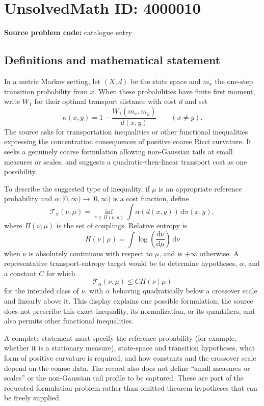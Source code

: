 \documentclass[11pt]{article}
\begin{document}
\section*{UnsolvedMath ID: 4000010}
\textbf{Source problem code:} catalogue entry
\subsection{Definitions and mathematical statement}
In a metric Markov setting, let $(X,d)$ be the state space and $m_x$ the one-step transition probability from $x$. When these probabilities have finite first moment, write $W_1$ for their optimal transport distance with cost $d$ and set
\[
 \kappa(x,y)=1-\frac{W_1(m_x,m_y)}{d(x,y)}\qquad(x\ne y).
\]
The source asks for transportation inequalities or other functional inequalities expressing the concentration consequences of positive coarse Ricci curvature. It seeks a genuinely coarse formulation allowing non-Gaussian tails at small measures or scales, and suggests a quadratic-then-linear transport cost as one possibility.

To describe the suggested type of inequality, if $\mu$ is an appropriate reference probability and $\alpha:[0,\infty)\to[0,\infty)$ is a cost function, define
\[
 \mathcal T_\alpha(\nu,\mu)
 =\inf_{\pi\in\Pi(\nu,\mu)}\int\alpha(d(x,y))\,\mathrm d\pi(x,y),
\]
where $\Pi(\nu,\mu)$ is the set of couplings. Relative entropy is
\[
 H(\nu\mid\mu)=\int\log\!\left(\frac{\mathrm d\nu}{\mathrm d\mu}\right)\,\mathrm d\nu
\]
when $\nu$ is absolutely continuous with respect to $\mu$, and is $+\infty$ otherwise. A representative transport-entropy target would be to determine hypotheses, $\alpha$, and a constant $C$ for which
\[
 \mathcal T_\alpha(\nu,\mu)\le C H(\nu\mid\mu)
\]
for the intended class of $\nu$, with $\alpha$ behaving quadratically below a crossover scale and linearly above it. This display explains one possible formulation; the source does not prescribe this exact inequality, its normalization, or its quantifiers, and also permits other functional inequalities.

A complete statement must specify the reference probability (for example, whether it is a stationary measure), state-space and transition hypotheses, what form of positive curvature is required, and how constants and the crossover scale depend on the coarse data. The record also does not define ``small measures or scales'' or the non-Gaussian tail profile to be captured. These are part of the requested formulation problem rather than omitted theorem hypotheses that can be freely supplied.
\end{document}
